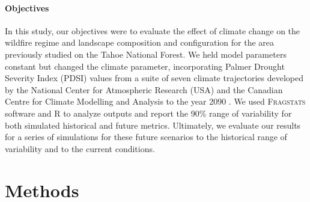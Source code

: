 \documentclass[12pt]{article}
\begin{document}
\begin{spacing}{1}
\paragraph{Objectives}
In this study, our objectives were to evaluate the effect of climate change on the wildfire regime and landscape composition and configuration for the area previously studied on the Tahoe National Forest. We held model parameters constant but changed the climate parameter, incorporating Palmer Drought Severity Index (PDSI) values from a suite of seven climate trajectories developed by the National Center for Atmospheric Research (USA) and the Canadian Centre for Climate Modelling and Analysis to the year 2090 \citep{Cook2014}. We used \textsc{Fragstats} software and R to analyze outputs and report the 90\% range of variability for both simulated historical and future metrics. Ultimately, we evaluate our results for a series of simulations for these future scenarios to the historical range of variability and to the current conditions. 


















\section*{Methods}


\end{spacing}
\end{document}

